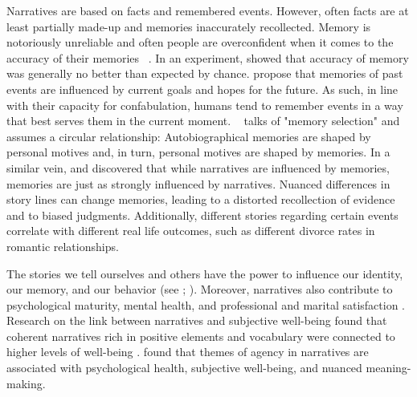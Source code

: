 \documentclass[11pt,a4paper,english,oneside]{book}
\numberwithin{equation}{chapter}
\begin{document}
Narratives are based on facts and remembered events. However, often facts are at least partially made-up and memories inaccurately recollected. Memory is notoriously unreliable and often people are overconfident when it comes to the accuracy of their memories ~\citep{McAdams.2006}. In an experiment, \citet{Offer.2000} showed that accuracy of memory was generally no better than expected by chance. \citet{Conway.2000} propose that memories of past events are influenced by current goals and hopes for the future. As such, in line with their capacity for confabulation, humans tend to remember events in a way that best serves them in the current moment. ~\citet[~p. 300]{McAdams.1982} talks of "memory selection" and assumes a circular relationship: Autobiographical memories are shaped by personal motives and, in turn, personal motives are shaped by memories. In a similar vein, \citet{McGregor.1999} and \citet{Murray.1994} discovered that while narratives are influenced by memories, memories are just as strongly influenced by narratives. Nuanced differences in story lines can change memories, leading to a distorted recollection of evidence and to biased judgments. Additionally, different stories regarding certain events correlate with different real life outcomes, such as different divorce rates in romantic relationships. 

The stories we tell ourselves and others have the power to influence our identity, our memory, and our behavior (see \citealp{Pasupathi.1998}; \citealp{Murray.1994}). Moreover, narratives also contribute to psychological maturity, mental health, and professional and marital satisfaction \citep[p. 248]{McAdams.}. Research on the link between narratives and subjective well-being found that coherent narratives rich in positive elements and vocabulary were connected to higher levels of well-being \citep{King.2000}. \cite{Adler.2008} found that themes of agency in narratives are associated with psychological health, subjective well-being, and nuanced meaning-making. 
\end{document}

